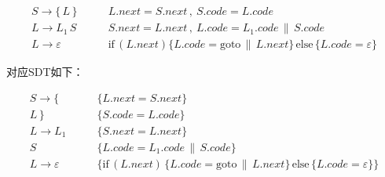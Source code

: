 \documentclass[UTF8]{report}
\begin{document}
\begin{enumerate}[label=(\arabic*)]
    \begin{align*}
        S \to \{\,L\,\} \qquad &L.next = S.next \,,\ S.code = L.code \\
        L \to L_1 \, S \qquad &S.next = L.next \,,\ L.code = L_1.code \, \| \, S.code \\
        L \to \varepsilon \qquad &\text{if} \, (L.next) \{L.code = \text{goto} \, \| \, L.next\} \, \text{else} \, \{L.code = \varepsilon\}
    \end{align*}

    对应SDT如下：

    \begin{align*}
        S \to \{ \qquad &\{L.next = S.next\} \\
        L \, \} \qquad &\{S.code = L.code\} \\
        L \to L_1 \qquad &\{S.next = L.next\} \\
        S \qquad &\{L.code = L_1.code \, \| \, S.code\} \\
        L \to \varepsilon \qquad &\{\text{if} \, (L.next) \, \{L.code = \text{goto} \, \| \, L.next\} \, \text{else} \, \{L.code = \varepsilon\}\}
    \end{align*}


\end{enumerate}
\end{document}
